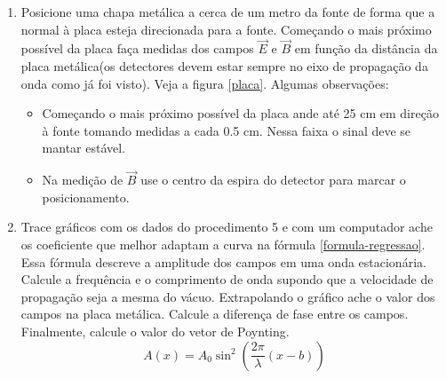 \documentclass[a4paper,11pt]{article}
\begin{document}
\begin{enumerate}
	\item Posicione uma chapa metálica a cerca de um metro da fonte de forma que a normal à placa esteja direcionada para a fonte. Começando o mais próximo possível da placa faça medidas dos campos $ \vec{E} $ e $ \vec{B} $ em função da distância da placa metálica(os detectores devem estar sempre no eixo de propagação da onda como já foi visto). Veja a figura \ref{placa}. Algumas observações:
			\begin{itemize}
				\item Começando o mais próximo possível da placa ande até 25 cm em direção à fonte tomando medidas a cada 0.5 cm. Nessa faixa o sinal deve se mantar estável.
				\item Na medição de $ \vec{B} $ use o centro da espira do detector para marcar o posicionamento.
			\end{itemize}
	\item Trace gráficos com os dados do procedimento 5 e com um computador ache os coeficiente que melhor adaptam a curva na fórmula \ref{formula-regressao}. Essa fórmula descreve a amplitude dos campos em uma onda estacionária. Calcule a frequência e o comprimento de onda supondo que a velocidade de propagação seja a mesma do vácuo. Extrapolando o gráfico ache o valor dos campos na placa metálica. Calcule a diferença de fase entre os campos. Finalmente, calcule o valor do vetor de Poynting.  
		\begin{equation}
				A(x) = A_0 \sin ^2 (\frac{2 \pi}{\lambda}(x - b))
				\label{formula-regressao}
		\end{equation}
\end{enumerate}
\FloatBarrier
\end{document}
